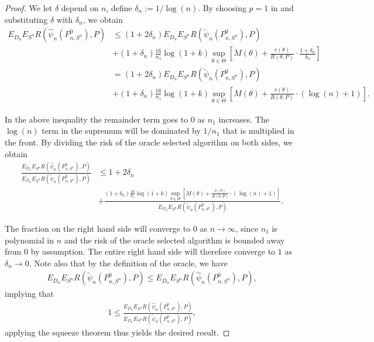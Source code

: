 \documentclass[11pt, a4paper]{article}
\theoremstyle{definition}
\theoremstyle{remark}
\newcommand{\btheta}{\theta}
\newcommand{\la}{\psi}
\newcommand{\Sn}{S^n}
\begin{document}
\begin{proof}
    We let $ \delta $ depend on $ n $, define $ \delta_n := 1/\log(n) $.  By choosing $ p = 1 $ in  and substituting $ \delta $ with $ \delta_n $, we obtain
    \begin{align*}
        E_{D_n} E_{\Sn} R(\hat{\la}_n(P_{n, \Sn}^{0}), P) &\leq(1 + 2 \delta_n) E_{D_n} E_{\Sn} R(\tilde{\la}_n(P_{n,\Sn}^{0}), P)\\
                                                        &+(1 + \delta_n) \frac{16}{n_1} \log (1 +k) \sup_{\btheta \in \Theta} \left[ M(\theta) + \frac{v(\theta)}{R(\theta, P)} \cdot \frac{1 + \delta_n}{\delta_n}  \right]\\
                                                        &= (1 + 2 \delta_n) E_{D_n} E_{\Sn} R(\tilde{\la}_n(P_{n,\Sn}^{0}), P)\\
                                                        &+(1 + \delta_n) \frac{16}{n_1} \log (1 +k) \sup_{\btheta \in \Theta} \left[ M(\theta) + \frac{v(\theta)}{R(\theta, P)} \cdot (\log(n) + 1) \right].
    \end{align*}

    In the above inequality the remainder term goes to $ 0 $ as $ n_1 $ increases. The $ \log(n) $ term in the supremum will be dominated by $ 1/n_1 $ that is multiplied in the front. By dividing the risk of the oracle selected algorithm on both sides, we obtain
    \begin{align*}
        \frac{E_{D_n} E_{\Sn} R(\hat{\la}_n(P_{n, \Sn}^{0}), P)}{E_{D_n} E_{\Sn} R(\tilde{\la}_n(P_{n,\Sn}^{0}), P)} 
        &\leq 1 + 2 \delta_n\\
        &+\frac{(1 + \delta_n)\frac{16}{n_1} \log (1 +k) \sup_{\btheta \in \Theta} \left[ M(\theta) + \frac{v(\theta)}{R(\theta , P)} \cdot (\log(n) + 1) \right]}{E_{D_n} E_{\Sn} R( \tilde{\la}_n(P_{n,\Sn}^{0}), P)}.
    \end{align*}

    The fraction on the right hand side will converge to $ 0 $ as $ n \to \infty $, since $ n_1 $ is polynomial in $ n $ and the risk of the oracle selected algorithm is bounded away from $ 0 $ by assumption. The entire right hand side will therefore converge to $ 1 $ as $ \delta_n \to 0 $. Note also that by the definition of the oracle, we have 
    \begin{align*}
        E_{D_n} E_{\Sn} R(\tilde{\la}_n(P_{n,\Sn}^{0}), P) \leq E_{D_n} E_{\Sn} R(\hat{\la}_n(P_{n,\Sn}^{0}), P),
    \end{align*}
    implying that 
        \begin{align*}
            1 \leq \frac{E_{D_n} E_{\Sn} R(\hat{\la}_n(P_{n, \Sn}^{0}), P)}{E_{D_n} E_{\Sn} R(\tilde{\la}_n(P_{n,\Sn}^{0}), P)}, 
    \end{align*}
    applying the squeeze theorem thus yields the desired result.         
\end{proof}
\end{document}
